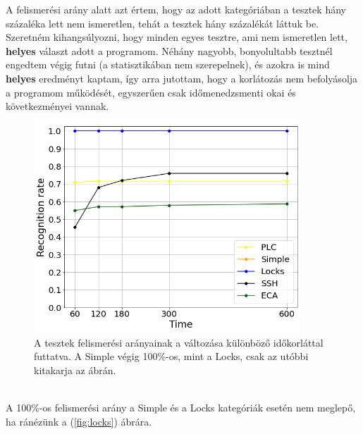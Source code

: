 A felismerési arány alatt azt értem, hogy az adott kategóriában a tesztek hány százaléka lett nem ismeretlen, tehát a tesztek hány százalékát láttuk be. Szeretném kihangsúlyozni, hogy minden egyes tesztre, ami nem ismeretlen lett, \textbf{helyes} választ adott a programom. Néhány nagyobb, bonyolultabb tesztnél engedtem végig futni (a statisztikában nem szerepelnek), és azokra is mind \textbf{helyes} eredményt kaptam, így arra jutottam, hogy a korlátozás nem befolyásolja a programom működését, egyszerűen csak időmenedzsmenti okai és következményei vannak.
\\
\begin{figure}[!ht]
	\centering
	\includegraphics[width=100mm, keepaspectratio]{figures/fig_rec_rate_during_time.png}
	\caption[Caption for LOF]{A tesztek felismerési arányainak a változása különböző időkorláttal futtatva. A Simple végig 100\%-os, mint a Locks, csak az utóbbi kitakarja az ábrán.}
	\label{fig:mivaaaa_geccasui}
\end{figure}
\ \\
A 100\%-os felismerési arány a Simple és a Locks kategóriák esetén nem meglepő, ha ránézünk a (\ref{fig:locks}) ábrára.

\clearpage

